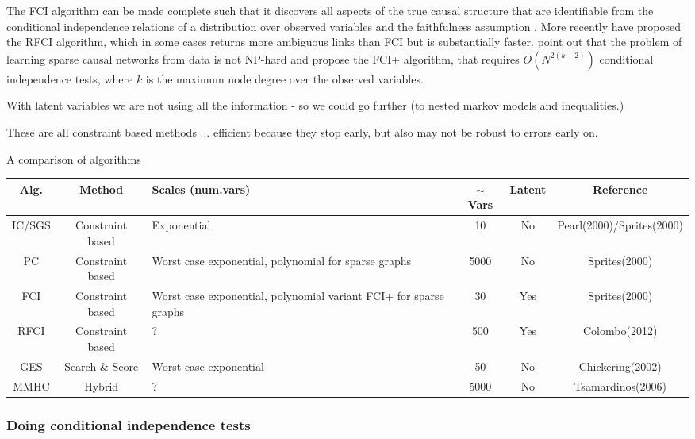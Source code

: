 \documentclass[11pt,a4paper,oneside]{book}
\begin{document}
The FCI algorithm can be made complete such that it discovers all aspects of the true causal structure that are identifiable from the conditional independence relations of a distribution over observed variables and the faithfulness assumption \cite{Zhang2008}. More recently \cite{Colombo2012} have proposed the RFCI algorithm, which in some cases returns more ambiguous links than FCI but is substantially faster. \cite{Claassen2013} point out that the problem of learning sparse causal networks from data is not NP-hard and propose the FCI+ algorithm, that requires $O(N^{2(k+2)})$ conditional independence tests, where $k$ is the maximum node degree over the observed variables. 

With latent variables we are not using all the information - so we could go further (to nested markov models and inequalities.) \cite{Richardson2012} \cite{Shipster2014}


These are all constraint based methods ... efficient because they stop early, but also may not be robust to errors early on. 

A comparison of algorithms 

\renewcommand{\arraystretch}{1.5}
\begin{tabular}{| c | c | p{4cm} | c | c | c |}
\hline
  \textbf {Alg.} &\textbf{ Method }& \textbf{Scales (num.vars) }& $\sim $ \textbf {Vars} & \textbf {Latent } & \textbf {Reference} \\
  \hline
  IC/SGS & Constraint based & Exponential & 10 & No & Pearl(2000)/Sprites(2000)\\
  \hline
  PC & Constraint based & Worst case exponential, polynomial for sparse graphs & 5000 & No & Sprites(2000) \\ 
  \hline
  FCI & Constraint based & Worst case exponential, polynomial variant FCI+ for sparse graphs & 30 & Yes & Sprites(2000) \\
  \hline
  RFCI & Constraint based & ? & 500 & Yes & Colombo(2012) \\
  \hline
  GES & Search \& Score  & Worst case exponential & 50 & No & Chickering(2002) \\
  \hline
  MMHC & Hybrid & ? & 5000 & No & Tsamardinos(2006) \\
 \hline
\end{tabular}

\subsubsection{Doing conditional independence tests}
\end{document}
